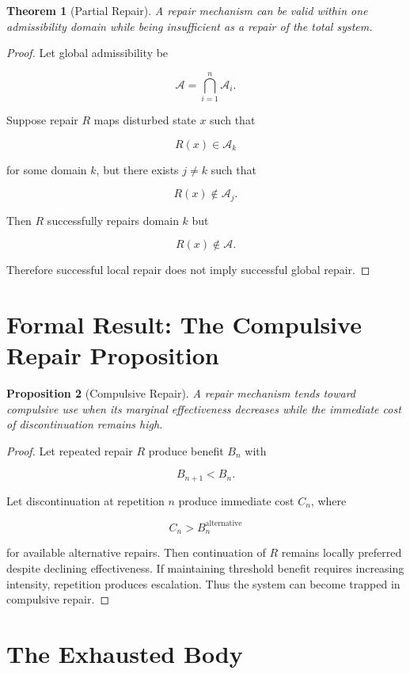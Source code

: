 \documentclass[11pt,oneside]{book}
\newtheorem{theorem}{Theorem}[chapter]
\newtheorem{proposition}[theorem]{Proposition}
\theoremstyle{definition}
\theoremstyle{remark}
\newcommand{\A}{\mathcal{A}}
\begin{document}
\begin{theorem}[Partial Repair]
A repair mechanism can be valid within one admissibility domain while being insufficient as a repair of the total system.
\end{theorem}

\begin{proof}
Let global admissibility be

\[
\A
=
\bigcap_{i=1}^{n}\A_i.
\]

Suppose repair \(R\) maps disturbed state \(x\) such that

\[
R(x)\in\A_k
\]

for some domain \(k\), but there exists \(j\neq k\) such that

\[
R(x)\notin\A_j.
\]

Then \(R\) successfully repairs domain \(k\) but

\[
R(x)\notin\A.
\]

Therefore successful local repair does not imply successful global repair.
\end{proof}

\section{Formal Result: The Compulsive Repair Proposition}

\begin{proposition}[Compulsive Repair]
A repair mechanism tends toward compulsive use when its marginal effectiveness decreases while the immediate cost of discontinuation remains high.
\end{proposition}

\begin{proof}
Let repeated repair \(R\) produce benefit \(B_n\) with

\[
B_{n+1}<B_n.
\]

Let discontinuation at repetition \(n\) produce immediate cost \(C_n\), where

\[
C_n>B_n^{\mathrm{alternative}}
\]

for available alternative repairs. Then continuation of \(R\) remains locally preferred despite declining effectiveness. If maintaining threshold benefit requires increasing intensity, repetition produces escalation. Thus the system can become trapped in compulsive repair.
\end{proof}

\section{The Exhausted Body}
\end{document}
